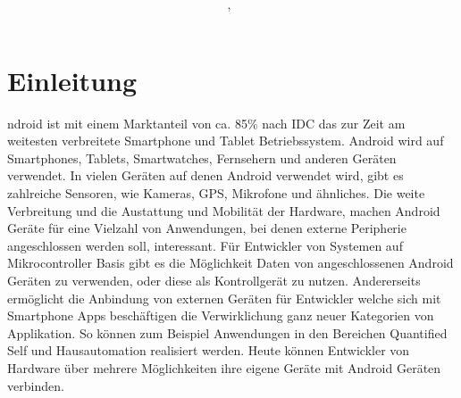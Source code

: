 \documentclass[12pt,journal,compsoc]{IEEEtran}
\begin{document}
\title{\paperTitle \\ \paperSubTitle }
\author{\paperAuthor,~}%



\maketitle

\section{Einleitung}


ndroid ist mit einem Marktanteil von ca. 85\% nach IDC das zur Zeit am weitesten verbreitete Smartphone und Tablet Betriebssystem.\cite{marketshare}
Android wird auf Smartphones, Tablets, Smartwatches, Fernsehern und anderen Geräten verwendet.
In vielen Geräten auf denen Android verwendet wird, gibt es zahlreiche Sensoren, wie Kameras, GPS, Mikrofone und ähnliches.
Die weite Verbreitung und die Austattung und Mobilität der Hardware, machen Android Geräte für eine Vielzahl von Anwendungen, bei denen externe Peripherie angeschlossen werden soll, interessant.
Für Entwickler von Systemen auf Mikrocontroller Basis gibt es die Möglichkeit Daten von angeschlossenen Android Geräten zu verwenden, oder diese als Kontrollgerät zu nutzen.
Andererseits ermöglicht die Anbindung von externen Geräten für Entwickler welche sich mit Smartphone Apps beschäftigen die Verwirklichung ganz neuer Kategorien von Applikation. 
So können zum Beispiel Anwendungen in den Bereichen Quantified Self und Hausautomation realisiert werden. 
Heute können Entwickler von Hardware über mehrere Möglichkeiten ihre eigene Geräte mit Android Geräten verbinden.
\end{document}
